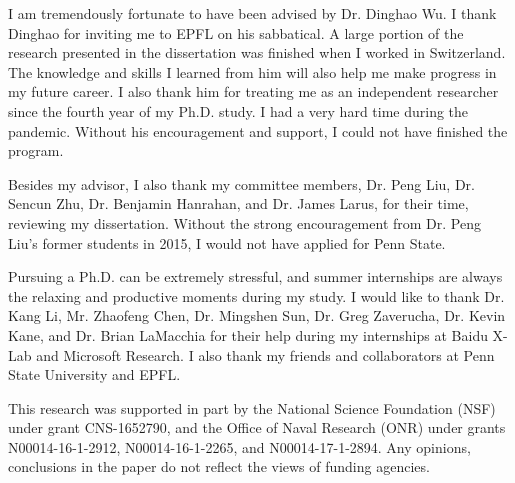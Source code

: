 I am tremendously fortunate to have been advised by Dr. Dinghao Wu.  I thank Dinghao for inviting me to EPFL on his sabbatical. A large portion of the research presented in the dissertation was finished when I worked in Switzerland. The knowledge and skills I learned from him will also help me make progress in my future career. I also thank him for treating me as an independent researcher since the fourth year of my Ph.D. study. I had a very hard time during the pandemic. Without his encouragement and support, I could not have finished the program.

Besides my advisor, I also thank my committee members, Dr. Peng Liu, Dr. Sencun Zhu, Dr. Benjamin Hanrahan, and Dr. James Larus, for their time, reviewing my dissertation. Without the strong encouragement from Dr. Peng Liu's former students in 2015, I would not have applied for Penn State.

Pursuing a Ph.D. can be extremely stressful, and summer internships are always the relaxing and productive moments during my study. I would like to thank Dr. Kang Li, Mr. Zhaofeng Chen, Dr. Mingshen Sun, Dr. Greg Zaverucha, Dr. Kevin Kane, and Dr. Brian LaMacchia for their help during my internships at Baidu X-Lab and Microsoft Research.  I also thank my friends and collaborators at Penn State University and EPFL. 

This research was supported in part by the National Science Foundation (NSF) under grant CNS-1652790, and the Office of Naval Research (ONR) under grants N00014-16-1-2912, N00014-16-1-2265, and N00014-17-1-2894. Any opinions, conclusions in the paper do not reflect the views of funding agencies.

